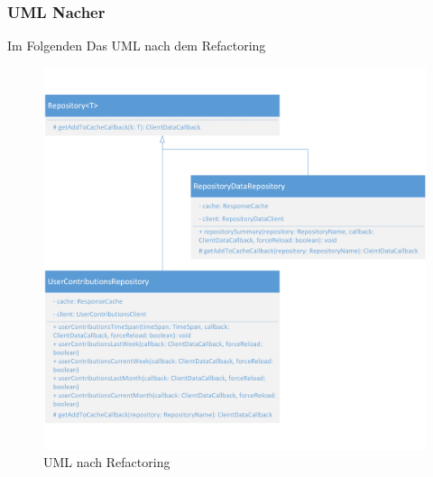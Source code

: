 \documentclass[12pt]{article}
\begin{document}
\newpage
\subsubsection{UML Nacher}
Im Folgenden Das UML nach dem Refactoring
\begin{figure}[h]
  \includegraphics{refactoring_extract_method_repository_after.png}
  \caption{UML nach Refactoring}
  \label{fig:ExtractMethod_Refactoring_After}
\end{figure}
\end{document}
